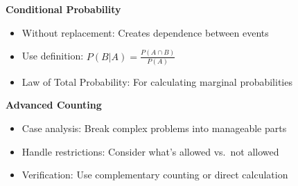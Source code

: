 \documentclass[
  11pt,
]{article}
\begin{document}
\textbf{Conditional Probability}

\begin{itemize}
\item
  Without replacement: Creates dependence between events
\item
  Use definition: \(P(B|A) = \frac{P(A \cap B)}{P(A)}\)
\item
  Law of Total Probability: For calculating marginal probabilities
\end{itemize}

\textbf{Advanced Counting}

\begin{itemize}
\item
  Case analysis: Break complex problems into manageable parts
\item
  Handle restrictions: Consider what's allowed vs.~not allowed
\item
  Verification: Use complementary counting or direct calculation
\end{itemize}
\end{document}
